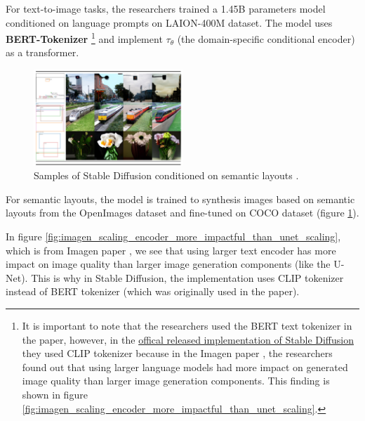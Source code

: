 For text-to-image tasks, the researchers trained a 1.45B parameters model conditioned on language prompts on LAION-400M dataset. The model uses \textbf{BERT-Tokenizer} \footnote{It is important to note that the researchers used the BERT text tokenizer in the paper, however, in the \href{https://github.com/CompVis/latent-diffusion}{offical released implementation of Stable Diffusion} they used CLIP tokenizer because in the Imagen paper \cite{imagen}, the researchers found out that using larger language models had more impact on generated image quality than larger image generation components. This finding is shown in figure \ref{fig:imagen_scaling_encoder_more_impactful_than_unet_scaling}.} \cite{bert} and implement $\tau_\theta$ (the domain-specific conditional encoder) as a transformer.

\begin{figure}
    \centering
    \includegraphics[width=0.5\textwidth]{images/diffusion_models/stable_diffusion/experiments_3.png}
    \caption{Samples of Stable Diffusion conditioned on semantic layouts \cite{stable_diffusion}.}
    \label{fig:stable_diffusion_experiments_semantic_layouts}
\end{figure}

For semantic layouts, the model is trained to synthesis images based on semantic layouts from the OpenImages dataset and fine-tuned on COCO dataset (figure \ref{fig:stable_diffusion_experiments_semantic_layouts}).

In figure \ref{fig:imagen_scaling_encoder_more_impactful_than_unet_scaling}, which is from Imagen paper \cite{imagen}, we see that using larger text encoder has more impact on image quality than larger image generation components (like the U-Net). This is why in Stable Diffusion, the implementation uses CLIP tokenizer instead of BERT tokenizer (which was originally used in the paper).
